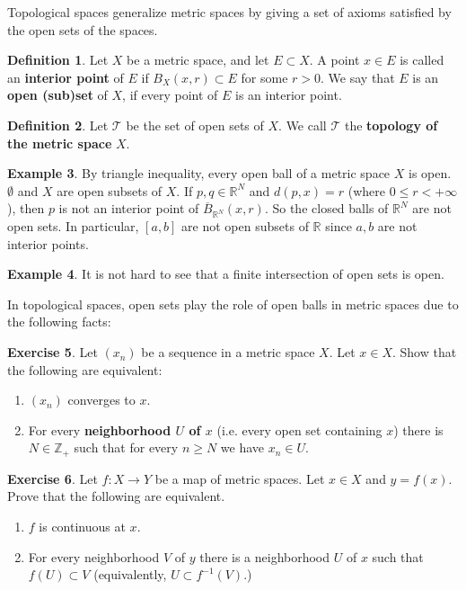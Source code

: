 \documentclass[12pt,b5paper,notitlepage]{article}
\theoremstyle{definition}
\newtheorem{df}{Definition}[section]
\newtheorem{eg}[df]{Example}
\newtheorem{exe}[df]{Exercise}
\theoremstyle{plain}
\newcommand{\mc}{\mathcal}
\newcommand{\ovl}{\overline}
\newcommand{\Zbb}{\mathbb Z}
\newcommand{\Rbb}{\mathbb R}
\numberwithin{equation}{section}
\begin{document}
Topological spaces generalize metric spaces by giving a set of axioms satisfied by the open sets of the spaces.

\begin{df}\label{lb168}
Let $X$ be a metric space, and let $E\subset X$. A point $x\in E$ is called an \textbf{interior point} of $E$ if $B_X(x,r)\subset E$ for some $r>0$. We say that $E$ is an \textbf{open (sub)set} of $X$,  if every point of $E$ is an interior point.
\end{df}

\begin{df}
Let $\mc T$ be the set of open sets of $X$. We call $\mc T$ the \textbf{topology of the metric space} $X$. 
\end{df}

\begin{eg}
By triangle inequality, every open ball of a metric space $X$ is open. $\emptyset$ and $X$ are open subsets of $X$. If $p,q\in\Rbb^N$ and $d(p,x)=r$ (where $0\leq r<+\infty$), then $p$ is not an interior point of $\ovl B_{\Rbb^N}(x,r)$. So the closed balls of $\Rbb^N$ are not open sets. In particular, $[a,b]$ are not open subsets of $\Rbb$ since $a,b$ are not interior points.
\end{eg}

\begin{eg}
It is not hard to see that a finite intersection of open sets is open.
\end{eg}



In topological spaces, open sets play the role of open balls in metric spaces due to the following facts:

\begin{exe}
Let $(x_n)$ be a sequence in a metric space $X$. Let $x\in X$. Show that the following are equivalent:
\begin{enumerate}[label=(\arabic*)]
\item $(x_n)$ converges to $x$.
\item For every \textbf{neighborhood $U$ of $x$} (i.e. every open set containing $x$) there is $N\in\Zbb_+$ such that for every $n\geq N$ we have $x_n\in U$.
\end{enumerate}
\end{exe}
\begin{exe}
Let $f:X\rightarrow Y$ be a map of metric spaces. Let $x\in X$ and $y=f(x)$. Prove that the following are equivalent. 
\begin{enumerate}[label=(\arabic*)]
\item $f$ is continuous at $x$.
\item For every neighborhood $V$ of $y$ there is a neighborhood $U$ of $x$ such that $f(U)\subset V$ (equivalently, $U\subset f^{-1}(V)$.)
\end{enumerate}
\end{exe}
\end{document}
